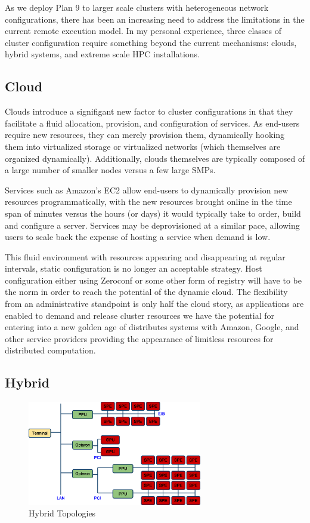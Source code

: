 \documentclass{sig-alternate}
\begin{document}
As we deploy Plan 9 to larger scale clusters with heterogeneous network
configurations, there has been an increasing need to address the limitations
in the current remote execution model.  In my personal experience, three
classes of cluster configuration require something beyond the current 
mechanisms: clouds, hybrid systems, and extreme scale HPC installations.

\subsection*{Cloud}

Clouds introduce a signifigant new factor to cluster configurations in 
that they facilitate a fluid allocation, provision, and configuration of
services.  As end-users require new resources, they can merely provision
them, dynamically hooking them into virtualized storage or virtualized
networks (which themselves are organized dynamically).  Additionally,
clouds themselves are typically composed of a large number of smaller nodes 
versus a few large SMPs.

Services such as Amazon's EC2 allow end-users to dynamically provision
new resources programmatically, with the new resources brought online in
the time span of minutes versus the hours (or days) it would typically
take to order, build and configure a server.  Services may be deprovisioned
at a similar pace, allowing users to scale back the expense of hosting a
service when demand is low.

This fluid environment with resources appearing and disappearing at
regular intervals, static configuration is no longer an acceptable strategy.
Host configuration either using Zeroconf or some other form of registry will
have to be the norm in order to reach the potential of the dynamic cloud.
The flexibility from an administrative standpoint is only half the cloud
story, as applications are enabled to demand and release cluster resources
we have the potential for entering into a new golden age of distributes 
systems with Amazon, Google, and other service providers providing the
appearance of limitless resources for distributed computation.

\subsection*{Hybrid}

\begin{figure}[h]
\begin{center}
\includegraphics[width=3in, keepaspectratio]{hybrid-topology.eps}
\end{center}
\caption{Hybrid Topologies}
\label{fig:hybrid}
\end{figure}
\end{document}
